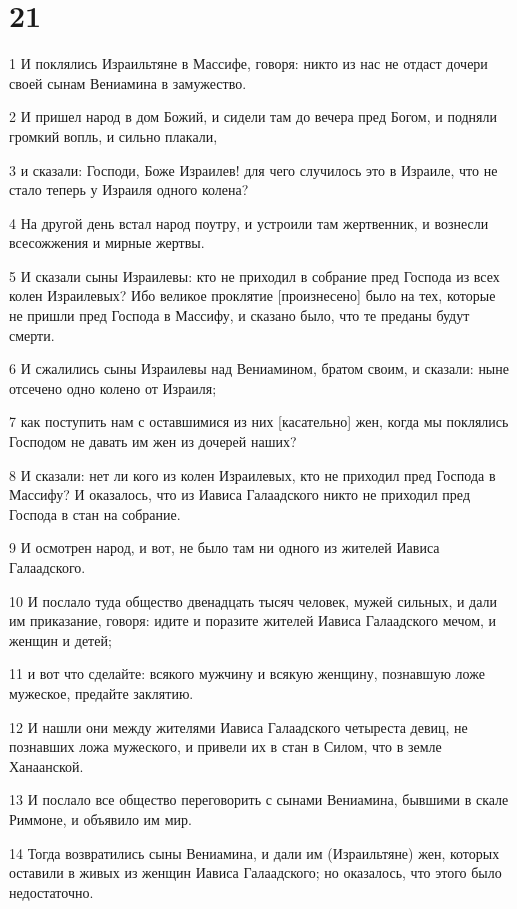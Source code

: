 \chapter{21}

\par 1 И поклялись Израильтяне в Массифе, говоря: никто из нас не отдаст дочери своей сынам Вениамина в замужество.
\par 2 И пришел народ в дом Божий, и сидели там до вечера пред Богом, и подняли громкий вопль, и сильно плакали,
\par 3 и сказали: Господи, Боже Израилев! для чего случилось это в Израиле, что не стало теперь у Израиля одного колена?
\par 4 На другой день встал народ поутру, и устроили там жертвенник, и вознесли всесожжения и мирные жертвы.
\par 5 И сказали сыны Израилевы: кто не приходил в собрание пред Господа из всех колен Израилевых? Ибо великое проклятие [произнесено] было на тех, которые не пришли пред Господа в Массифу, и сказано было, что те преданы будут смерти.
\par 6 И сжалились сыны Израилевы над Вениамином, братом своим, и сказали: ныне отсечено одно колено от Израиля;
\par 7 как поступить нам с оставшимися из них [касательно] жен, когда мы поклялись Господом не давать им жен из дочерей наших?
\par 8 И сказали: нет ли кого из колен Израилевых, кто не приходил пред Господа в Массифу? И оказалось, что из Иависа Галаадского никто не приходил пред Господа в стан на собрание.
\par 9 И осмотрен народ, и вот, не было там ни одного из жителей Иависа Галаадского.
\par 10 И послало туда общество двенадцать тысяч человек, мужей сильных, и дали им приказание, говоря: идите и поразите жителей Иависа Галаадского мечом, и женщин и детей;
\par 11 и вот что сделайте: всякого мужчину и всякую женщину, познавшую ложе мужеское, предайте заклятию.
\par 12 И нашли они между жителями Иависа Галаадского четыреста девиц, не познавших ложа мужеского, и привели их в стан в Силом, что в земле Ханаанской.
\par 13 И послало все общество переговорить с сынами Вениамина, бывшими в скале Риммоне, и объявило им мир.
\par 14 Тогда возвратились сыны Вениамина, и дали им (Израильтяне) жен, которых оставили в живых из женщин Иависа Галаадского; но оказалось, что этого было недостаточно.
